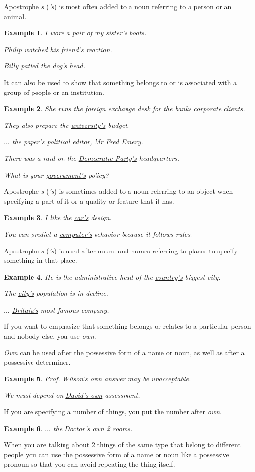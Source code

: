 \documentclass[oneside]{book}
\numberwithin{equation}{section}
\newtheorem{example}{Example}[section]
\begin{document}
%
\noindent{} Apostrophe \textit{s} (\textit{'s}) is most often added to a noun referring to a person or an animal.
\begin{example}
    I wore a pair of my \underline{sister's} boots.
    
    Philip watched his \underline{friend's} reaction.
    
    Billy patted the \underline{dog's} head.
\end{example}
It can also be used to show that something belongs to or is associated with a group of people or an institution.
\begin{example}
    She runs the foreign exchange desk for the \underline{banks} corporate clients.
    
    They also prepare the \underline{university's} budget.
    
    $\ldots$ the \underline{paper's} political editor, Mr Fred Emery.
    
    There was a raid on the \underline{Democratic Party's} headquarters.
    
    What is your \underline{government's} policy?
\end{example}
%
\noindent{} Apostrophe \textit{s} (\textit{'s}) is sometimes added to a noun referring to an object when specifying a part of it or a quality or feature that it has.
\begin{example}
    I like the \underline{car's} design.
    
    You can predict a \underline{computer's} behavior because it follows rules.
\end{example}
Apostrophe \textit{s} (\textit{'s}) is used after nouns and names referring to places to specify something in that place.
\begin{example}
    He is the administrative head of the \underline{country's} biggest city.
    
    The \underline{city's} population is in decline.
    
    $\ldots$ \underline{Britain's} most famous company.
\end{example}
%
\noindent{} If you want to emphasize that something belongs or relates to a particular person and nobody else, you use \textit{own}.

\textit{Own} can be used after the possessive form of a name or noun, as well as after a possessive determiner.
\begin{example}
    \underline{Prof. Wilson's own} answer may be unacceptable.
    
    We must depend on \underline{David's own} assessment.
\end{example}
If you are specifying a number of things, you put the number after \textit{own}.
\begin{example}
    $\ldots$ the Doctor's \underline{own 2} rooms.
\end{example}
%
\noindent{} When you are talking about 2 things of the same type that belong to different people you can use the possessive form of a name or noun like a possessive pronoun so that you can avoid repeating the thing itself.
\end{document}
